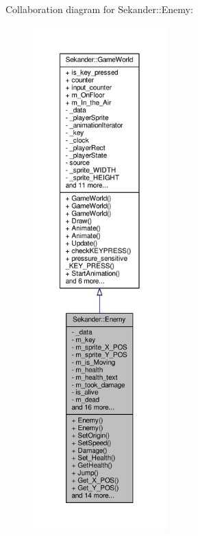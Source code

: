 Collaboration diagram for Sekander\+:\+:Enemy\+:
\nopagebreak
\begin{figure}[H]
\begin{center}
\leavevmode
\includegraphics[height=550pt]{classSekander_1_1Enemy__coll__graph}
\end{center}
\end{figure}
